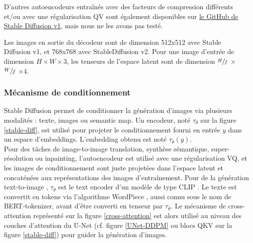 \documentclass{article}
\begin{document}
D'autres autoencodeurs entraînés avec des facteurs de compression différents et/ou avec une régularisation QV sont également disponibles sur \href{https://github.com/CompVis/stable-diffusion/tree/main/models/first_stage_models}{le GitHub de Stable Diffusion v1}, mais nous ne les avons pas testé. \par
Les images en sortie du décodeur sont de dimension 512x512 avec Stable Diffusion v1, et 768x768 avec StableDiffusion v2. Pour une image d'entrée de dimension $H \times W \times 3$, les tenseurs de l'espace latent sont de dimension \Large $\sfrac{H}{f}$ \normalsize $\times$ \Large $\sfrac{W}{f}$ \normalsize $\times 4$.

\subsubsection{Mécanisme de conditionnement}

Stable Diffusion permet de conditionner la génération d'images via plusieurs modalités : texte, images ou semantic map. Un encodeur, noté $\tau_{\theta}$ sur la figure \ref{stable-diff}, est utilisé pour projeter le conditionnement fourni en entrée $y$ dans un espace d'embeddings. L'embedding obtenu est noté $\tau_{\theta}(y)$.\\
Pour des tâches de image-to-image translation, synthèse sémantique, super-résolution ou inpainting, l'autoencodeur est utilisé avec une régularisation VQ, et les images de conditionnement sont juste projetées dans l'espace latent et concaténées aux représentations des images d'entraînement. Pour de la génération text-to-image , $\tau_{\theta}$ est le text encoder d'un modèle de type CLIP \cite{CLIP}. Le texte est convertit en tokens via l'algorithme WordPiece \cite{WordPiece}, aussi connu sous le nom de BERT-tokenizer, avant d'être converti en tenseur par $\tau_{\theta}$. Le mécanisme de cross-attention représenté sur la figure \ref{cross-attention} est alors utilisé au niveau des couches d'attention du U-Net (cf. figure \ref{UNet-DDPM} ou blocs QKV sur la figure \ref{stable-diff}) pour guider la génération d'images.
\end{document}

